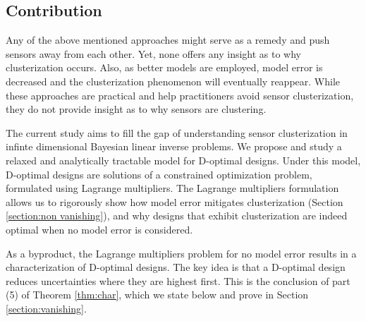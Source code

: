 

\subsection{Contribution}
Any of the above mentioned approaches might serve as a remedy and push
sensors away from each other. Yet, none offers any insight as to why
clusterization occurs. Also, as better models are employed, model
error is decreased and the clusterization phenomenon will eventually
reappear. While these approaches are practical and help practitioners
avoid sensor clusterization, they do not provide insight as to why
sensors are clustering.

The current study aims to fill the gap of understanding sensor
clusterization in infinte dimensional Bayesian linear inverse
problems. We propose and study a relaxed and analytically tractable
model for D-optimal designs. Under this model, D-optimal designs are
solutions of a constrained optimization problem, formulated using
Lagrange multipliers. The Lagrange multipliers formulation allows us
to rigorously show how model error mitigates clusterization (Section
\ref{section:non vanishing}), and why designs that exhibit
clusterization are indeed optimal when no model error is considered.

As a byproduct, the Lagrange multipliers problem for no model error
results in a characterization of D-optimal designs. The key idea is
that a D-optimal design reduces uncertainties where they are highest
first. This is the conclusion of part (5) of Theorem \ref{thm:char},
which we state below and prove in Section \ref{section:vanishing}.

